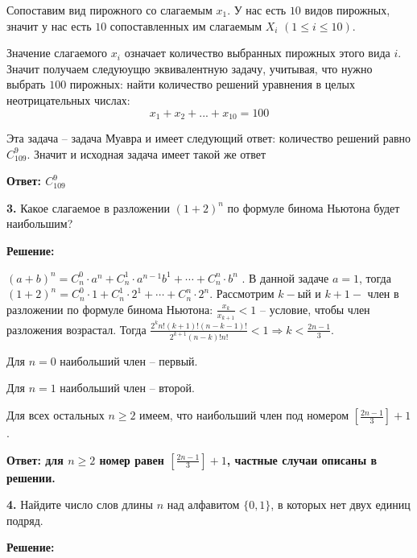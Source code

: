 \documentclass[a4paper,12pt]{article} %
\begin{document}
Сопоставим вид пирожного со слагаемым $x_1$. У нас есть $10$ видов пирожных, значит у нас есть $10$ сопоставленных им слагаемым $X_i$ $(1 \leqslant i \leqslant 10)$.

Значение слагаемого $x_i$ означает количество выбранных пирожных этого вида $i$. Значит получаем следуюущю эквивалентную задачу, учитывая, что нужно выбрать $100$ пирожных: найти количество решений уравнения в целых неотрицательных числах:
\[x_1 + x_2 + ... + x_{10} = 100\]

Эта задача -- задача Муавра и имеет следующий ответ: количество решений равно $C^9_{109}$. Значит и исходная задача имеет такой же ответ

\begin{flushright}
\begin{large}
\textbf {Ответ:  $C^9_{109}$}
\end{large}
\end{flushright}

{\bf 3.} Какое слагаемое в разложении $(1 + 2)^n$ по формуле бинома Ньютона
будет наибольшим?
\begin{center}
\bfseries
{\Large Решение: }
\end{center}

$(a+b)^n = C_n^0\cdot a^n + C_n^1\cdot a^{n-1}b^1 + \cdots + C^n_n\cdot b^n$	. В данной задаче $a = 1$, тогда $(1+2)^n = C_n^0\cdot 1 + C_n^1\cdot 2^1 + \cdots + C^n_n\cdot 2^n$. Рассмотрим $k-$ый и $k+1-$ член в разложении по формуле бинома Ньютона: $\frac{x_k}{x_{k+1}} < 1$ -- условие, чтобы член разложения возрастал. Тогда $\frac{2^k n! (k+1)! (n-k-1)!}{2^{k+1} (n-k)! n!} < 1 \Rightarrow k < \frac{2n-1}{3}$.

Для $n = 0$ наибольший член -- первый.

Для $n = 1$ наибольший член -- второй.

Для всех остальных $n \geqslant 2$ имеем, что наибольший член под номером $\left[ \frac{2n-1}{3} \right] + 1$.


\begin{flushright}
\begin{large}
\textbf {Ответ: для $n \geqslant 2$ номер равен $\left[ \frac{2n-1}{3} \right] + 1$, частные случаи описаны в решении.}
\end{large}
\end{flushright}

{\bf 4.} Найдите число слов длины $n$ над алфавитом $\{0, 1\}$, в которых нет
двух единиц подряд.
\begin{center}
\bfseries
{\Large Решение: }
\end{center}
\end{document}
